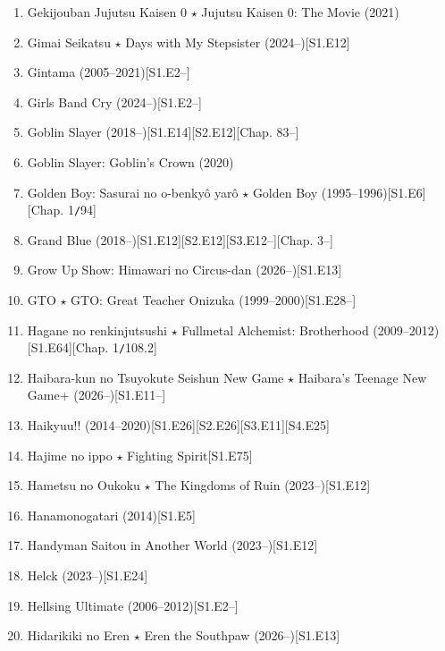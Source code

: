 \documentclass{article}
\begin{document}
\begin{enumerate}
    \item {\sc Gekijouban Jujutsu Kaisen 0 $\star$ Jujutsu Kaisen 0: The Movie} (2021)
    \item {\sc Gimai Seikatsu $\star$ Days with My Stepsister} (2024--)\hfill[S1.E12]
    \item Gintama (2005--2021)\hfill[S1.E2--]
    \item Girls Band Cry (2024--)\hfill[S1.E2--]
    \item {\sc Goblin Slayer} (2018--)\hfill[S1.E14][S2.E12][Chap. 83--]
    \item {\sc Goblin Slayer: Goblin's Crown} (2020)
    \item {\sc Golden Boy: Sasurai no o-benky\^o yar\^o $\star$ Golden Boy} (1995--1996)\hfill[S1.E6][Chap. 1{\tt/}94]
    \item {\sc Grand Blue} (2018--)\hfill[S1.E12][S2.E12][S3.E12--][Chap. 3--]
    \item {\sc Grow Up Show: Himawari no Circus-dan} (2026--)\hfill[S1.E13]
    \item GTO $\star$ GTO: Great Teacher Onizuka (1999--2000)\hfill[S1.E28--]
    \item {\sc Hagane no renkinjutsushi $\star$ Fullmetal Alchemist: Brotherhood} (2009--2012)\hfill[S1.E64][Chap. 1{\tt/}108.2]
    \item Haibara-kun no Tsuyokute Seishun New Game $\star$ Haibara's Teenage New Game+ (2026--)\hfill[S1.E11--]
    \item {\sc Haikyuu!!} (2014--2020)\hfill[S1.E26][S2.E26][S3.E11][S4.E25]
    \item {\sc Hajime no ippo $\star$ Fighting Spirit}\hfill[S1.E75]
    \item {\sc Hametsu no Oukoku $\star$ The Kingdoms of Ruin} (2023--)\hfill[S1.E12]
    \item {\sc Hanamonogatari} (2014)\hfill[S1.E5]
    \item {\sc Handyman Saitou in Another World} (2023--)\hfill[S1.E12]
    \item {\sc Helck} (2023--)\hfill[S1.E24]
    \item Hellsing Ultimate (2006--2012)\hfill[S1.E2--]
    \item {\sc Hidarikiki no Eren $\star$ Eren the Southpaw} (2026--)\hfill[S1.E13]
    

\end{enumerate}
\end{document}
